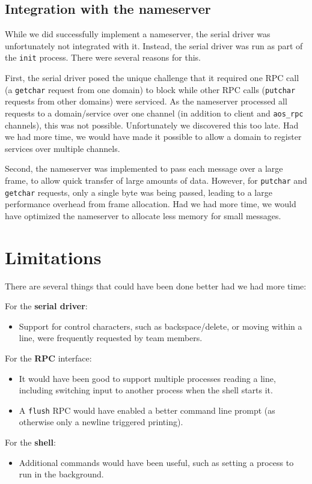 \subsection{Integration with the nameserver}
\label{shell-integration-ns}

While we did successfully implement a nameserver, the serial driver was unfortunately not integrated with it.
Instead, the serial driver was run as part of the \verb|init| process.
There were several reasons for this.

First, the serial driver posed the unique challenge that it required one RPC call (a \verb|getchar| request from one domain) to block while other RPC calls (\verb|putchar| requests from other domains) were serviced.
As the nameserver processed all requests to a domain/service over one channel (in addition to client and \verb|aos_rpc| channels), this was not possible.
Unfortunately we discovered this too late.
Had we had more time, we would have made it possible to allow a domain to register services over multiple channels.

Second, the nameserver was implemented to pass each message over a large frame, to allow quick transfer of large amounts of data.
However, for \verb|putchar| and \verb|getchar| requests, only a single byte was being passed, leading to a large performance overhead from frame allocation.
Had we had more time, we would have optimized the nameserver to allocate less memory for small messages.


\section{Limitations}

There are several things that could have been done better had we had more time:

For the \textbf{serial driver}:
\begin{itemize}

    \item
        Support for control characters, such as backspace/delete, or moving within a line, were frequently requested by team members.

\end{itemize}

For the \textbf{RPC} interface:
\begin{itemize}

    \item
        It would have been good to support multiple processes reading a line, including switching input to another process when the shell starts it.

    \item
        A \verb|flush| RPC would have enabled a better command line prompt (as otherwise only a newline triggered printing).

\end{itemize}

For the \textbf{shell}:
\begin{itemize}

    \item
        Additional commands would have been useful, such as setting a process to run in the background.

\end{itemize}

